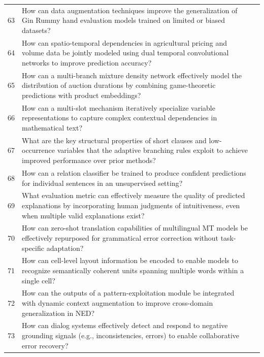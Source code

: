 \begin{longtable}{@{}p{0.5cm}p{7.2cm}p{2.5cm}@{}}
63 & How can data augmentation techniques improve the generalization of Gin Rummy hand evaluation models trained on limited or biased datasets? & \cite{10.1609/aaai.v35i17.17843} \\
64 & How can spatio-temporal dependencies in agricultural pricing and volume data be jointly modeled using dual temporal convolutional networks to improve prediction accuracy? & \cite{10.1609/aaai.v34i08.7039} \\
65 & How can a multi-branch mixture density network effectively model the distribution of auction durations by combining game-theoretic predictions with product embeddings? & \cite{10.1609/aaai.v38i9.28854} \\
66 & How can a multi-slot mechanism iteratively specialize variable representations to capture complex contextual dependencies in mathematical text? & \cite{10.18653/v1/2022.findings-acl.76} \\
67 & What are the key structural properties of short clauses and low-occurrence variables that the adaptive branching rules exploit to achieve improved performance over prior methods? & \cite{10.1609/aaai.v35i5.16479} \\
68 & How can a relation classifier be trained to produce confident predictions for individual sentences in an unsupervised setting? & \cite{10.18653/v1/p19-1133} \\
69 & What evaluation metric can effectively measure the quality of predicted explanations by incorporating human judgments of intuitiveness, even when multiple valid explanations exist? & \cite{10.1609/aaai.v36i11.21577} \\
70 & How can zero-shot translation capabilities of multilingual MT models be effectively repurposed for grammatical error correction without task-specific adaptation? & \cite{10.18653/v1/2024.eacl-long.73} \\
71 & How can cell-level layout information be encoded to enable models to recognize semantically coherent units spanning multiple words within a single cell? & \cite{10.18653/v1/2021.acl-long.493} \\
72 & How can the outputs of a pattern-exploitation module be integrated with dynamic context augmentation to improve cross-domain generalization in NED? & \cite{10.18653/v1/2022.findings-emnlp.506} \\
73 & How can dialog systems effectively detect and respond to negative grounding signals (e.g., inconsistencies, errors) to enable collaborative error recovery? & \cite{10.18653/v1/2021.eacl-main.41} \\

\end{longtable}
